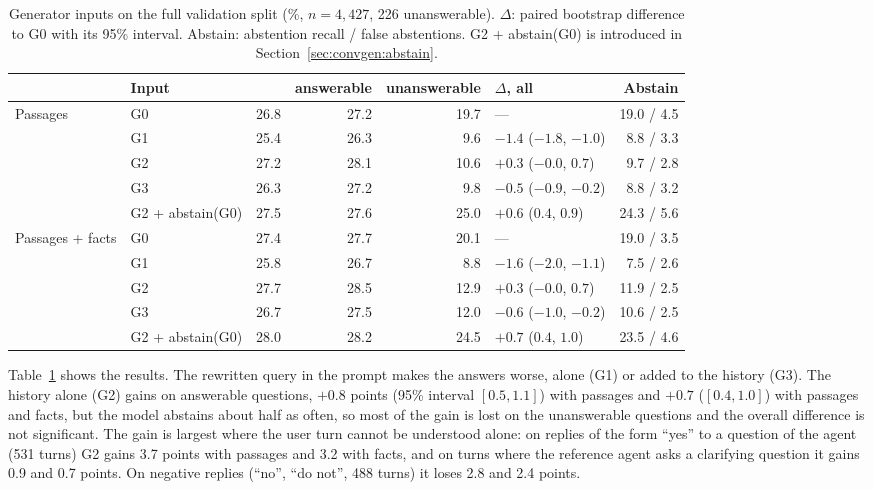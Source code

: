 \begin{table}[ht]
    \centering
    \caption{Generator inputs on the full validation split (\%, $n = 4{,}427$, 226
    unanswerable). $\Delta$: paired bootstrap difference to G0 with its 95\% interval.
    Abstain: abstention recall / false abstentions. G2 + abstain(G0) is introduced in
    Section~\ref{sec:convgen:abstain}.}
    \label{tab:convgen:input}
    \small
    \begin{tabular}{llrrrlr}
        \toprule
        & Input & \fone{} & answerable & unanswerable & $\Delta$\fone{}, all & Abstain \\
        \midrule
        Passages & G0 & 26.8 & 27.2 & 19.7 & ---                     & 19.0 / 4.5 \\
                 & G1 & 25.4 & 26.3 &  9.6 & $-1.4$ ($-1.8$, $-1.0$) &  8.8 / 3.3 \\
                 & G2 & 27.2 & 28.1 & 10.6 & $+0.3$ ($-0.0$, $0.7$)  &  9.7 / 2.8 \\
                 & G3 & 26.3 & 27.2 &  9.8 & $-0.5$ ($-0.9$, $-0.2$) &  8.8 / 3.2 \\
                 & G2 + abstain(G0) & 27.5 & 27.6 & 25.0 & $+0.6$ ($0.4$, $0.9$) & 24.3 / 5.6 \\
        \midrule
        Passages + facts & G0 & 27.4 & 27.7 & 20.1 & ---                    & 19.0 / 3.5 \\
                 & G1 & 25.8 & 26.7 &  8.8 & $-1.6$ ($-2.0$, $-1.1$) &  7.5 / 2.6 \\
                 & G2 & 27.7 & 28.5 & 12.9 & $+0.3$ ($-0.0$, $0.7$)  & 11.9 / 2.5 \\
                 & G3 & 26.7 & 27.5 & 12.0 & $-0.6$ ($-1.0$, $-0.2$) & 10.6 / 2.5 \\
                 & G2 + abstain(G0) & 28.0 & 28.2 & 24.5 & $+0.7$ ($0.4$, $1.0$) & 23.5 / 4.6 \\
        \bottomrule
    \end{tabular}
\end{table}

Table~\ref{tab:convgen:input} shows the results. The rewritten query in the prompt makes
the answers worse, alone (G1) or added to the history (G3). The history alone (G2) gains
on answerable questions, $+0.8$ points (95\% interval $[0.5, 1.1]$) with passages and
$+0.7$ ($[0.4, 1.0]$) with passages and facts, but the model abstains about half as often,
so most of the gain is lost on the unanswerable questions and the overall difference is
not significant. The gain is largest where the user turn cannot be understood alone: on
replies of the form ``yes'' to a question of the agent (531 turns) G2 gains 3.7 points with
passages and 3.2 with facts, and on turns where the reference agent asks a clarifying
question it gains 0.9 and 0.7 points. On negative replies (``no'', ``do not'', 488 turns)
it loses 2.8 and 2.4 points.


